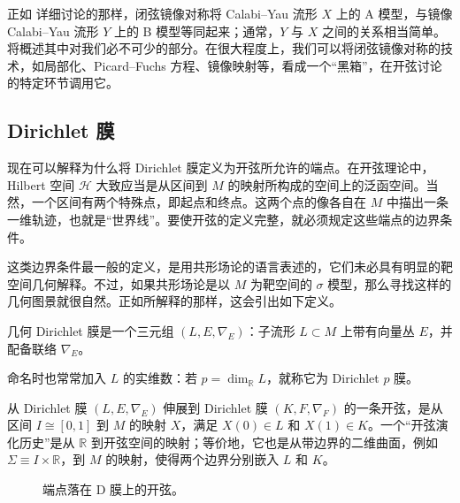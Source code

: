 正如  详细讨论的那样，闭弦镜像对称将 Calabi--Yau 流形 $X$ 上的 A 模型，与镜像 Calabi--Yau 流形 $Y$ 上的 B 模型等同起来；通常，$Y$ 与 $X$ 之间的关系相当简单。将概述其中对我们必不可少的部分。在很大程度上，我们可以将闭弦镜像对称的技术，如局部化、Picard--Fuchs 方程、镜像映射等，看成一个“黑箱”，在开弦讨论的特定环节调用它。

\subsection{Dirichlet 膜}\label{sec:1.1.3}

现在可以解释为什么将 Dirichlet 膜定义为开弦所允许的端点。在开弦理论中，Hilbert 空间 $\mathcal{H}$ 大致应当是从区间到 $M$ 的映射所构成的空间上的泛函空间。当然，一个区间有两个特殊点，即起点和终点。这两个点的像各自在 $M$ 中描出一条一维轨迹，也就是“世界线”。要使开弦的定义完整，就必须规定这些端点的边界条件。

这类边界条件最一般的定义，是用共形场论的语言表述的，它们未必具有明显的靶空间几何解释。不过，如果共形场论是以 $M$ 为靶空间的 $\sigma$ 模型，那么寻找这样的几何图景就很自然。正如所解释的那样，这会引出如下定义。

\begin{definition}\label{def:1.2}
几何 Dirichlet 膜是一个三元组 $(L,E,\nabla_E)$：子流形 $L\subset M$ 上带有向量丛 $E$，并配备联络 $\nabla_E$。
\end{definition}

命名时也常常加入 $L$ 的实维数：若 $p=\dim_{\mathbb{R}}L$，就称它为 Dirichlet $p$ 膜。

从 Dirichlet 膜 $(L,E,\nabla_E)$ 伸展到 Dirichlet 膜 $(K,F,\nabla_F)$ 的一条开弦，是从区间 $I\cong[0,1]$ 到 $M$ 的映射 $X$，满足 $X(0)\in L$ 和 $X(1)\in K$。一个“开弦演化历史”是从 $\mathbb{R}$ 到开弦空间的映射；等价地，它也是从带边界的二维曲面，例如 $\Sigma\equiv I\times\mathbb{R}$，到 $M$ 的映射，使得两个边界分别嵌入 $L$ 和 $K$。

\begin{figure}[H]
\centering
{}
\caption{端点落在 D 膜上的开弦。}\label{fig:1.1}
\end{figure}

